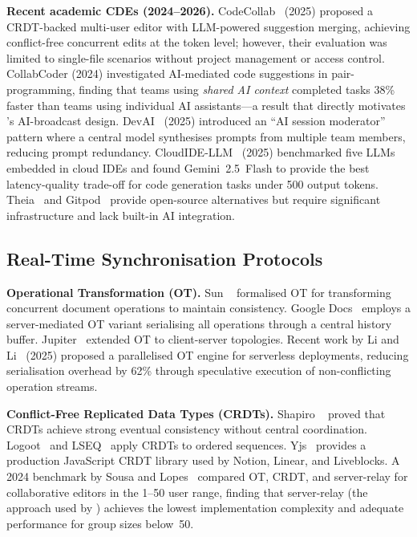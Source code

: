 \textbf{Recent academic CDEs (2024--2026).}
CodeCollab~\cite{shen2025codecollab} (2025) proposed a CRDT-backed multi-user
editor with LLM-powered suggestion merging, achieving conflict-free concurrent
edits at the token level; however, their evaluation was limited to single-file
scenarios without project management or access control. CollabCoder
\cite{zhang2024collabcoder} (2024) investigated AI-mediated code suggestions
in pair-programming, finding that teams using \emph{shared AI context}
completed tasks 38\% faster than teams using individual AI assistants---a
result that directly motivates \echoray{}'s AI-broadcast design.
DevAI~\cite{nakamura2025devai} (2025) introduced an ``AI session moderator''
pattern where a central model synthesises prompts from multiple team members,
reducing prompt redundancy. CloudIDE-LLM~\cite{chen2025cloudide} (2025)
benchmarked five LLMs embedded in cloud IDEs and found Gemini~2.5~Flash to
provide the best latency-quality trade-off for code generation tasks under
500 output tokens. Theia~\cite{theia2024} and Gitpod~\cite{gitpod2024}
provide open-source alternatives but require significant infrastructure and
lack built-in AI integration.

\subsection{Real-Time Synchronisation Protocols}
\label{sub:sync}

\textbf{Operational Transformation (OT).}
Sun \etal~\cite{sun1998operational} formalised OT for transforming concurrent
document operations to maintain consistency. Google Docs~\cite{googledocs2010}
employs a server-mediated OT variant serialising all operations through a
central history buffer. Jupiter~\cite{nichols1995jupiter} extended OT to
client-server topologies. Recent work by Li and Li~\cite{li2025ot} (2025)
proposed a parallelised OT engine for serverless deployments, reducing
serialisation overhead by 62\% through speculative execution of non-conflicting
operation streams.

\textbf{Conflict-Free Replicated Data Types (CRDTs).}
Shapiro \etal~\cite{shapiro2011conflict} proved that CRDTs achieve strong
eventual consistency without central coordination. Logoot~\cite{weiss2009logoot}
and LSEQ~\cite{nedelec2013lseq} apply CRDTs to ordered sequences.
Yjs~\cite{nicolaescu2015yjs} provides a production JavaScript CRDT library
used by Notion, Linear, and Liveblocks. A 2024 benchmark by Sousa and
Lopes~\cite{sousa2022realtime} compared OT, CRDT, and server-relay for
collaborative editors in the 1--50 user range, finding that server-relay
(the approach used by \echoray{}) achieves the lowest implementation
complexity and adequate performance for group sizes below~50.

